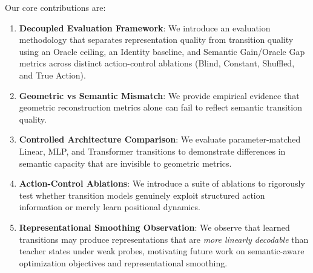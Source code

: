 Our core contributions are:
\begin{enumerate}
    \item \textbf{Decoupled Evaluation Framework}: We introduce an evaluation methodology that separates representation quality from transition quality using an Oracle ceiling, an Identity baseline, and Semantic Gain/Oracle Gap metrics across distinct action-control ablations (Blind, Constant, Shuffled, and True Action).
    \item \textbf{Geometric vs Semantic Mismatch}: We provide empirical evidence that geometric reconstruction metrics alone can fail to reflect semantic transition quality.
    \item \textbf{Controlled Architecture Comparison}: We evaluate parameter-matched Linear, MLP, and Transformer transitions to demonstrate differences in semantic capacity that are invisible to geometric metrics.
    \item \textbf{Action-Control Ablations}: We introduce a suite of ablations to rigorously test whether transition models genuinely exploit structured action information or merely learn positional dynamics.
    \item \textbf{Representational Smoothing Observation}: We observe that learned transitions may produce representations that are \textit{more linearly decodable} than teacher states under weak probes, motivating future work on semantic-aware optimization objectives and representational smoothing.
\end{enumerate}

